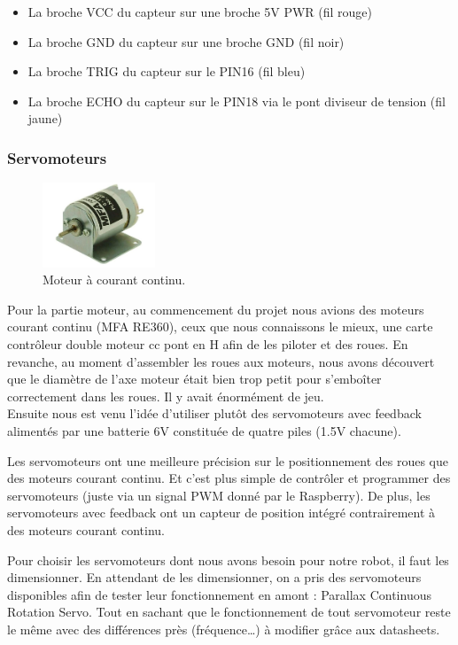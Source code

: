 \documentclass[a4paper,12pt]{report}  %
\begin{document}
\begin{itemize}
	\item La broche VCC du capteur sur une broche 5V PWR (fil rouge)
	\item La broche GND du capteur sur une broche GND (fil noir)
	\item La broche TRIG du capteur sur le PIN16 (fil bleu)
	\item La broche ECHO du capteur sur le PIN18 via le pont diviseur de tension (fil jaune) 
\end{itemize}

\subsubsection{Servomoteurs}

\begin{figure}[H]
	\centering
	\includegraphics[width=0.3\textwidth]{./attachments/moteur_continu.jpg}
	\caption{Moteur à courant continu.}
\end{figure}

Pour la partie moteur, au commencement du projet nous avions des moteurs courant continu (MFA RE360), ceux que nous connaissons le mieux, une carte contrôleur double moteur cc pont en H afin de les piloter et des roues. En revanche, au moment d’assembler les roues aux moteurs, nous avons découvert que le diamètre de l’axe moteur était bien trop petit pour s’emboîter correctement dans les roues. Il y avait énormément de jeu. \\

Ensuite nous est venu l’idée d’utiliser plutôt des servomoteurs avec feedback alimentés par une batterie 6V constituée de quatre piles (1.5V chacune).

Les servomoteurs ont une meilleure précision sur le positionnement des roues que des moteurs courant continu. Et c’est plus simple de contrôler et programmer des servomoteurs (juste via un signal PWM donné par le Raspberry). De plus, les servomoteurs avec feedback ont un capteur de position intégré contrairement à des moteurs courant continu. 

Pour choisir les servomoteurs dont nous avons besoin pour notre robot, il faut les dimensionner. En attendant de les dimensionner, on a pris des servomoteurs disponibles afin de tester leur fonctionnement en amont : Parallax Continuous Rotation Servo. Tout en sachant que le fonctionnement de tout servomoteur reste le même avec des différences près (fréquence…) à modifier grâce aux datasheets. \\
\end{document}
